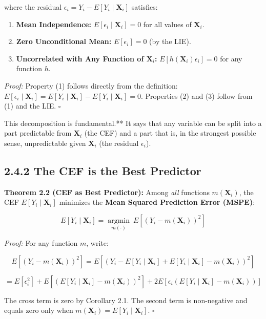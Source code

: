 where the residual $\epsilon_i = Y_i - E[Y_i \mid \mathbf{X}_i]$ satisfies:

\begin{enumerate}
\item \textbf{Mean Independence:} $E[\epsilon_i \mid \mathbf{X}_i] = 0$ for all values of $\mathbf{X}_i$.
\item \textbf{Zero Unconditional Mean:} $E[\epsilon_i] = 0$ (by the LIE).
\item \textbf{Uncorrelated with Any Function of $\mathbf{X}_i$:} $E[h(\mathbf{X}_i) \epsilon_i] = 0$ for any function $h$.
\end{enumerate}

\textit{Proof:} Property (1) follows directly from the definition: $E[\epsilon_i \mid \mathbf{X}_i] = E[Y_i \mid \mathbf{X}_i] - E[Y_i \mid \mathbf{X}_i] = 0$. Properties (2) and (3) follow from (1) and the LIE. $\square$

\begin{keybox}{This decomposition is fundamental.** It says that any variable can be split into a part predictable from $\mathbf{X}_i$ (the CEF) and a part that is, in the strongest possible sense, unpredictable given $\mathbf{X}_i$ (the residual $\epsilon_i$).}
\end{keybox}

\subsection{2.4.2 The CEF is the Best Predictor}

\textbf{Theorem 2.2 (CEF as Best Predictor):} Among \textit{all} functions $m(\mathbf{X}_i)$, the CEF $E[Y_i \mid \mathbf{X}_i]$ minimizes the \textbf{Mean Squared Prediction Error (MSPE)}:

\[
E[Y_i \mid \mathbf{X}_i] = \underset{m(\cdot)}{\operatorname{argmin}} \ E\!\left[(Y_i - m(\mathbf{X}_i))^2\right]
\]

\textit{Proof:} For any function $m$, write:

\[
E\left[(Y_i - m(\mathbf{X}_i))^2\right] = E\left[(Y_i - E[Y_i \mid \mathbf{X}_i] + E[Y_i \mid \mathbf{X}_i] - m(\mathbf{X}_i))^2\right]
\]

\[
= E[\epsilon_i^2] + E\left[(E[Y_i \mid \mathbf{X}_i] - m(\mathbf{X}_i))^2\right] + 2E\!\left[\epsilon_i (E[Y_i \mid \mathbf{X}_i] - m(\mathbf{X}_i))\right]
\]

The cross term is zero by Corollary 2.1. The second term is non-negative and equals zero only when $m(\mathbf{X}_i) = E[Y_i \mid \mathbf{X}_i]$. $\square$

